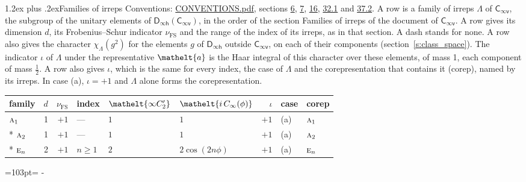 \documentclass[10pt,a4paper]{article}
\makeatletter
\renewcommand\section{\@startsection{section}{1}{\z@}{-3ex plus -1ex minus -.2ex}%
  {1.2ex plus .2ex}{\normalfont\large\sffamily\bfseries\color{parttitle}}}
\newcommand{\needspace}[1]{\par\penalty-100\begingroup\dimen0=#1\relax\dimen2=\pagegoal
  \advance\dimen2-\pagetotal\ifdim\dimen0>\dimen2\relax\ifdim\dimen2>0pt\vfil\break\fi\fi
  \endgroup}
\numberwithin{equation}{section}
\newcommand{\eltfont}[1]{{\let\sigma\eltsigma\mathelt{#1}}}
\newcommand{\grp}[1]{\mathsf{#1}}
\newcommand{\irr}[1]{\text{\normalfont\scshape #1}}
\newcommand{\comp}[1]{\eltfont{#1}}
\newcommand{\elt}[1]{\eltfont{#1}}
\newcommand{\irchar}[1]{\chi_{#1}}
\newcommand{\fsind}{\nu_{\mathrm{FS}}}
\makeatother
\begin{document}
\section{Families of irreps}\label{s:families}
Conventions: \href{../../CONVENTIONS.pdf}{CONVENTIONS.pdf}, sections \href{../../../rotation/CONVENTIONS.pdf\#conv.6}{6}, \href{../../../rotation/CONVENTIONS.pdf\#conv.7}{7}, \href{../../../rotation/CONVENTIONS.pdf\#conv.16}{16}, \href{../../CONVENTIONS.pdf\#conv.32.1}{32.1} and \href{../../CONVENTIONS.pdf\#conv.37.2}{37.2}.
\leavevmode\label{n:irrep.Delta}\label{n:head.family.irreps}A row is a family of irreps $\Lambda$ of $\grp{C_{\infty v}}$, the subgroup of the unitary elements of $\grp{D_{\infty h}}(\grp{C_{\infty v}})$, in the order of the section Families of irreps of the document of \href{../../../rotation/data/pdf/Cinfv.pdf}{$\grp{C_{\infty v}}$}. \label{n:index.dimension}\label{n:index.frobenius}\label{n:head.index.family}\label{n:index.family}A row gives its dimension $d$, its Frobenius--Schur indicator $\fsind$ and the range of the index of its irreps, as in that section. A dash stands for none. \label{n:function.character}A row also gives the character $\irchar{\Lambda}(g^2)$ for the elements $g$ of $\grp{D_{\infty h}}$ outside $\grp{C_{\infty v}}$, on each of their components (section~\ref{s:class_space}). The indicator $\iota$ of $\Lambda$ under the representative $\elt{a}$ is the Haar integral of this character over these elements, of mass 1, each component of mass $\tfrac{1}{2}$. \label{n:head.case.corep}\label{n:head.corep}A row also gives $\iota$, which is the same for every index, the case of $\Lambda$ and the corepresentation that contains it (corep), named by its irreps. In case (a), $\iota = +1$ and $\Lambda$ alone forms the corepresentation.
{\small\renewcommand{\arraystretch}{1.25}\begin{longtable}{@{}lrrlllrll@{}}\toprule
family & $d$ & $\fsind$ & index & $\comp{\infty C_2'}$ & $\comp{i\,C_{\infty}(\phi)}$ & $\iota$ & case & corep\\\midrule\endhead
\bottomrule\endfoot\endlastfoot
$\irr{a}_{1}$ & 1 & $+1$ & --- & $1$ & $1$ & $+1$ & (a) & $\irr{a}_{1}$\\*
$\irr{a}_{2}$ & 1 & $+1$ & --- & $1$ & $1$ & $+1$ & (a) & $\irr{a}_{2}$\\*
$\irr{e}_{n}$ & 2 & $+1$ & $n \ge 1$ & $2$ & $2\cos(2n\phi)$ & $+1$ & (a) & $\irr{e}_{n}$\\
\bottomrule\end{longtable}}
\needspace{103pt}
\end{document}
